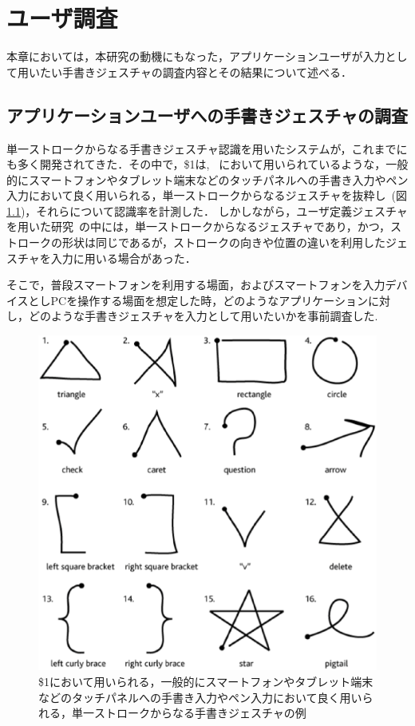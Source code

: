 \chapter{ユーザ調査}
本章においては，本研究の動機にもなった，アプリケーションユーザが入力として用いたい手書きジェスチャの調査内容とその結果について述べる．

\section{アプリケーションユーザへの手書きジェスチャの調査}
単一ストロークからなる手書きジェスチャ認識を用いたシステムが，これまでにも多く開発されてきた．その中で，\$1は,  ~\cite{Hong:2000:STI:354401.354412, Landay:1993:EEU:259964.260123, Lin:2000:DFT:332040.332486}において用いられているような，一般的にスマートフォンやタブレット端末などのタッチパネルへの手書き入力やペン入力において良く用いられる，単一ストロークからなるジェスチャを抜粋し~(図\ref{fig:stroke_1})，それらについて認識率を計測した．
しかしながら，ユーザ定義ジェスチャを用いた研究~\cite{Vatavu:2012:UGF:2325616.2325626, Bragdon:2011:EAT:1978942.1979000, Wobbrock:2009:UGS:1518701.1518866, Shimon:2015:EUB:2785830.2785890}の中には，単一ストロークからなるジェスチャであり，かつ，ストロークの形状は同じであるが，ストロークの向きや位置の違いを利用したジェスチャを入力に用いる場合があった．

そこで，普段スマートフォンを利用する場面，およびスマートフォンを入力デバイスとしPCを操作する場面を想定した時，どのようなアプリケーションに対し，どのような手書きジェスチャを入力として用いたいかを事前調査した.

\begin{figure}[!h]
\centering
\includegraphics[width=0.4\columnwidth]{img/stroke_1.eps}
\caption{\$1において用いられる，一般的にスマートフォンやタブレット端末などのタッチパネルへの手書き入力やペン入力において良く用いられる，単一ストロークからなる手書きジェスチャの例}
\label{fig:stroke_1}
\end{figure}

